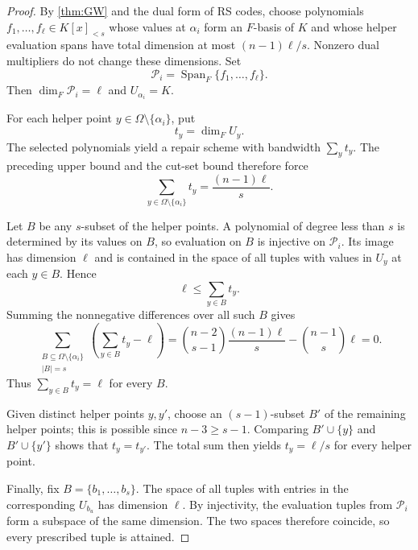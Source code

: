 \documentclass[11pt,onecolumn]{IEEEtran}
\newcommand{\Span}{\operatorname{Span}}
\begin{document}
\begin{proof}
By \cref{thm:GW} and the dual form of RS codes, choose
polynomials $f_1,\ldots,f_\ell\in K[x]_{<s}$ whose values at
$\alpha_i$ form an $F$-basis of $K$ and whose helper
evaluation spans have total dimension at most $(n-1)\ell/s$.
Nonzero dual multipliers do not change these dimensions. Set
\[
\mathcal P_i=\Span_F\{f_1,\ldots,f_\ell\}.
\]
Then $\dim_F\mathcal P_i=\ell$ and $U_{\alpha_i}=K$.

For each helper point $y\in\Omega\setminus\{\alpha_i\}$, put
\[
t_y=\dim_F U_{y}.
\]
The selected polynomials yield a repair scheme with bandwidth
$\sum_y t_y$. The preceding upper bound and the cut-set
bound therefore force
\[
\sum_{y\in\Omega\setminus\{\alpha_i\}}t_y=\frac{(n-1)\ell}{s}.
\]

Let $B$ be any $s$-subset of the helper points. A polynomial of degree
less than $s$ is determined by its values on $B$, so evaluation on
$B$ is injective on $\mathcal P_i$. Its image has dimension
$\ell$ and is contained in the space of all tuples with values in
$U_y$ at each $y\in B$. Hence
\begin{equation}
\ell\le\sum_{y\in B}t_y.
\label{eq:s-subset-local}
\end{equation}
Summing the nonnegative differences over all such $B$ gives
\[\sum_{\substack{B\subseteq\Omega\setminus\{\alpha_i\}\\ |B|=s}}
\left(\sum_{y\in B}t_y-\ell\right)=\binom{n-2}{s-1}\frac{(n-1)\ell}{s}
-\binom{n-1}{s}\ell
=0.\]
Thus $\sum_{y\in B}t_y=\ell$ for every $B$.

Given distinct helper points $y,y'$, choose an
$(s-1)$-subset $B'$ of the remaining helper points; this is possible
since $n-3\ge s-1$. Comparing
$B'\cup\{y\}$ and $B'\cup\{y'\}$ shows that $t_y=t_{y'}$.
The total sum then yields $t_y=\ell/s$ for every helper point.

Finally, fix $B=\{b_1,\ldots,b_s\}$. The space of all tuples with
entries in the corresponding $U_{b_u}$ has dimension $\ell$.
By injectivity, the evaluation tuples from $\mathcal P_i$ form a
subspace of the same dimension. The two spaces therefore coincide,
so every prescribed tuple is attained.
\end{proof}
\end{document}
